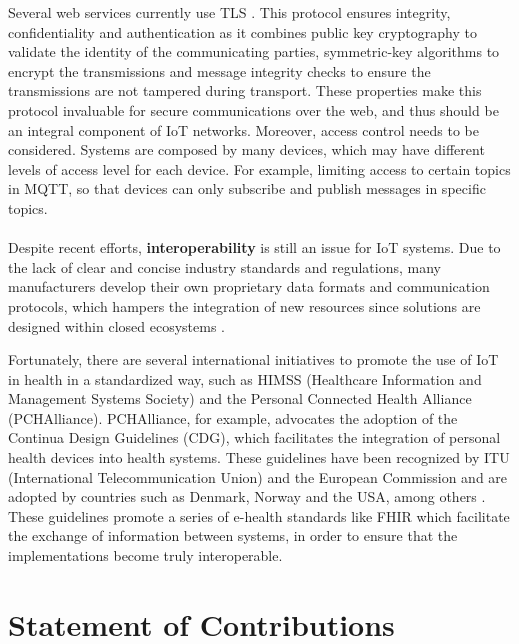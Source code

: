 Several web services currently use \acf{TLS} \cite{tls}. This protocol ensures integrity, confidentiality and authentication as it combines public key cryptography to validate the identity of the communicating parties, symmetric-key algorithms to encrypt the transmissions and message integrity checks to ensure the transmissions are not tampered during transport. These properties make this protocol invaluable for secure communications over the web, and thus should be an integral component of \acs{IoT} networks. Moreover, access control needs to be considered. Systems are composed by many devices, which may have different levels of access level for each device. For example, limiting access to certain topics in \acs{MQTT}, so that devices can only subscribe and publish messages in specific topics.      

\paragraph{} Despite recent efforts, \textbf{interoperability} is still an issue for \acs{IoT} systems. Due to the lack of clear and concise industry standards and regulations, many manufacturers develop their own proprietary data formats and communication protocols, which hampers the integration of new resources since solutions are designed within closed ecosystems \cite{Rubi2019}. \bigskip

Fortunately, there are several international initiatives to promote the use of \acs{IoT} in health in a standardized way, such as HIMSS (Healthcare Information and Management Systems Society) and the Personal Connected Health Alliance (PCHAlliance). PCHAlliance, for example, advocates the adoption of the Continua Design Guidelines (CDG), which facilitates the integration of personal health devices into health systems. These guidelines have been recognized by ITU (International Telecommunication Union) and the European Commission and are adopted by countries such as Denmark, Norway and the USA, among others \cite{PersonalConnectedHealthAlliance2017}. These guidelines promote a series of e-health standards like \acs{FHIR} which facilitate the exchange of information between systems, in order to ensure that the implementations become truly interoperable.

\clearpage
\section{Statement of Contributions}
\label{sec:statement_of_contrib}

